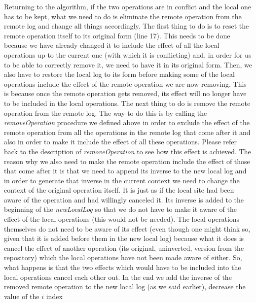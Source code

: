 \begin{itemize}
\begin{enumerate}
      Returning to the algorithm, if the two operations are in conflict and the local one has to be kept,
      what we need to do is eliminate the remote operation from the remote log and change all things
      accordingly. The first thing to do is to reset the remote operation itself to its original form (line 17).
      This needs to be done because we have already changed it to include the effect of all the local
      operations up to the current one (with which it is conflicting) and, in order for us to be able to
      correctly remove it, we need to have it in its original form. Then, we also have to restore the local
      log to its form before making some of the local operations include the effect of the remote operation
      we are now removing. This is because once the remote operation gets removed, its effect will no
      longer have to be included in the local operations. The next thing to do is remove the remote
      operation from the remote log. The way to do this is by calling the \emph{removeOperation} procedure
      we defined above in order to exclude the effect of the remote operation from all the operations
      in the remote log that come after it and also in order to make it include the effect of all these
      operations. Please refer back to the description of \emph{removeOperation} to see how this effect
      is achieved. The reason why we also need to make the remote operation include the effect of those
      that come after it is that we need to append its inverse to the new local log and in order to generate
      that inverse in the current context we need to change the context of the original operation itself.
      It is just as if the local site had been aware of the operation and had willingly canceled it.
      Its inverse is added to the beginning of the \emph{newLocalLog} so that we do not have to make it
      aware of the effect of the local operations (this would not be needed). The local operations
      themselves do not need to be aware of its effect (even though one might think so, given that it is
      added before them in the new local log) because what it does is cancel the effect of another
      operation (its original, uninverted, version from the repository) which the local operations have
      not been made aware of either. So, what happens is that the two effects which would have to be
      included into the local operations cancel each other out. In the end we add the inverse of the removed
      remote operation to the new local log (as we said earlier), decrease the value of the $i$ index

\end{enumerate}
\end{itemize}
